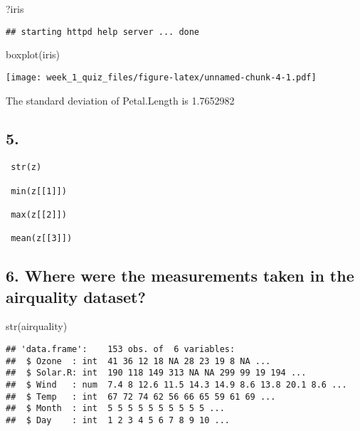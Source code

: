 \documentclass[
]{article}
\newenvironment{Shaded}{\begin{snugshade}}{\end{snugshade}}
\newcommand{\FunctionTok}[1]{\textcolor[rgb]{0.00,0.00,0.00}{#1}}
\newcommand{\NormalTok}[1]{#1}
\begin{document}
\begin{Shaded}
\begin{Highlighting}[]
\NormalTok{?iris}
\end{Highlighting}
\end{Shaded}

\begin{verbatim}
## starting httpd help server ... done
\end{verbatim}

\begin{Shaded}
\begin{Highlighting}[]
\FunctionTok{boxplot}\NormalTok{(iris)}
\end{Highlighting}
\end{Shaded}

\texttt{[image: week\_1\_quiz\_files/figure-latex/unnamed-chunk-4-1.pdf]}

The standard deviation of Petal.Length is 1.7652982

\hypertarget{section}{%
\subsection{5.}\label{section}}

\begin{verbatim}
 str(z)

 min(z[[1]])

 max(z[[2]])

 mean(z[[3]])
\end{verbatim}

\hypertarget{where-were-the-measurements-taken-in-the-airquality-dataset}{%
\subsection{6. Where were the measurements taken in the airquality
dataset?}\label{where-were-the-measurements-taken-in-the-airquality-dataset}}

\begin{Shaded}
\begin{Highlighting}[]
\FunctionTok{str}\NormalTok{(airquality)}
\end{Highlighting}
\end{Shaded}

\begin{verbatim}
## 'data.frame':    153 obs. of  6 variables:
##  $ Ozone  : int  41 36 12 18 NA 28 23 19 8 NA ...
##  $ Solar.R: int  190 118 149 313 NA NA 299 99 19 194 ...
##  $ Wind   : num  7.4 8 12.6 11.5 14.3 14.9 8.6 13.8 20.1 8.6 ...
##  $ Temp   : int  67 72 74 62 56 66 65 59 61 69 ...
##  $ Month  : int  5 5 5 5 5 5 5 5 5 5 ...
##  $ Day    : int  1 2 3 4 5 6 7 8 9 10 ...
\end{verbatim}
\end{document}
